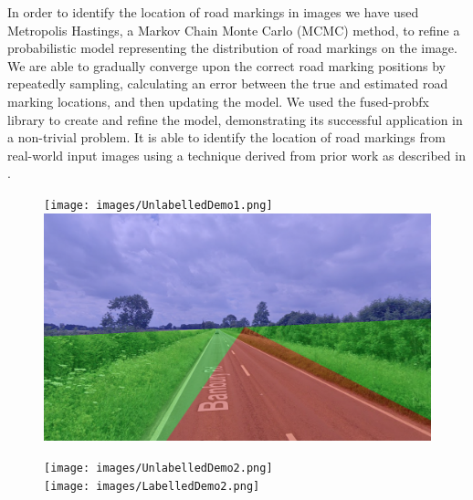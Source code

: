 \documentclass[conference]{IEEEtran}
\begin{document}
In order to identify the location of road markings in images we have used Metropolis Hastings, a Markov Chain Monte Carlo (MCMC) method, to refine a probabilistic model representing the distribution of road markings on the image. We are able to gradually converge upon the correct road marking positions by repeatedly sampling, calculating an error between the true and estimated road marking locations, and then updating the model. We used the fused-probfx library to create and refine the model, demonstrating its successful application in a non-trivial problem. It is able to identify the location of road markings from real-world input images using a technique derived from prior work as described in \cite{baysianimage}.
\par

\begin{figure}[h]
    \centering
    \begin{minipage}{.3\textwidth}
        \texttt{[image: images/UnlabelledDemo1.png]}
        \\ \includegraphics[height=.7\textwidth, width=\textwidth]{images/LabelledDemo1.png}
    \end{minipage}
    \begin{minipage}{.3\textwidth}
        \texttt{[image: images/UnlabelledDemo2.png]}
        \\ \texttt{[image: images/LabelledDemo2.png]}    
    \end{minipage}
    \begin{minipage}{.3\textwidth}

\end{minipage}
\end{figure}
\end{document}

